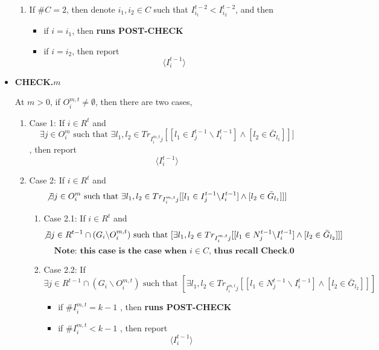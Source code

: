 \documentclass[12pt,letter]{article}
\theoremstyle{definition}
\theoremstyle{remark}
\theoremstyle{claim}
\begin{document}
\begin{itemize}
\begin{enumerate}
\item If $\#C=2$, then denote $i_1,i_2\in C$ such that $I^{t-2}_{i_1}<I^{t-2}_{i_2}$, and then
\begin{itemize}
\item if $i=i_1$, then 
\textbf{runs POST-CHECK }
\item if $i=i_2$, then report
\[\langle I^{t-1}_i \rangle\]

\end{itemize}
\end{enumerate}




\item \textbf{CHECK.$m$}

 At $m>0$, if $O^{m,t}_i\neq \emptyset$, then there are two cases, 
\begin{enumerate}
\item Case 1: If $i\in R^t$ and 
\[\exists j\in  O^m_i \text{ such that }\exists l_1,l_2\in Tr_{I^{m,t}_ij}[[l_1\in I^{t-1}_j\backslash I^{t-1}_i] \wedge [l_2\in \bar{G}_{l_1}]]]\]
, then report 
\[\langle I^{t-1}_i \rangle\]
\item Case 2: If $i\in R^t$ and 
\[\not\exists j\in  O^m_i \text{ such that }\exists l_1,l_2\in Tr_{I^{m,t}_ij}[[l_1\in I^{t-1}_j\backslash I^{t-1}_i] \wedge [l_2\in \bar{G}_{l_1}]]]\]

\begin{enumerate}
\item Case 2.1: If $i\in R^t$ and 
\[\not\exists j\in R^{t-1}\cap (G_i\backslash  O^{m,t}_i) \text{ such that }[\exists l_1,l_2\in Tr_{I^{m,t}_ij}[[l_1\in N^{t-1}_j\backslash I^{t-1}_i] \wedge [l_2\in \bar{G}_{l_2}]]]\]
\[\textbf{Note: this case is the case when $i\in C$, thus recall Check.0}\]

\item Case 2.2: If 
\[\exists j\in R^{t-1}\cap (G_i\backslash  O^{m,t}_i) \text{ such that }[\exists l_1,l_2\in Tr_{I^{m,t}_ij}[[l_1\in N^{t-1}_j\backslash I^{t-1}_i] \wedge [l_2\in \bar{G}_{l_2}]]]\]

\begin{itemize}
\item if $\# I^{m,t}_i= k-1$
, then 
\textbf{runs POST-CHECK }

\item if $\# I^{m,t}_i< k-1$
, then report 
\[\langle I^{t-1}_i \rangle\]
\end{itemize}





\end{enumerate}


\end{enumerate}
\end{itemize}
\end{document}
